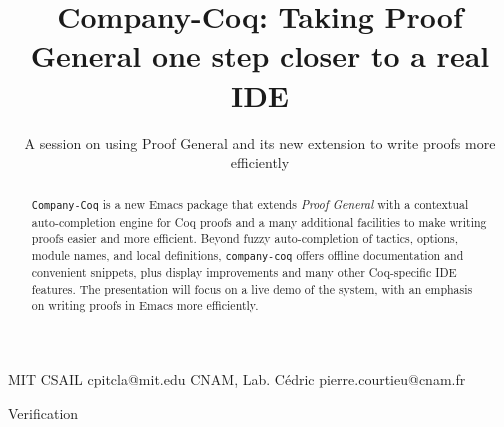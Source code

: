 \documentclass[preprint]{sigplanconf}
\begin{document}
\setlength{\pdfpageheight}{\paperheight}
\setlength{\pdfpagewidth}{\paperwidth}





\titlebanner{}        %

\title{Company-Coq: Taking Proof General one step closer to a real IDE}
\subtitle{A session on using Proof General and its new extension to write proofs more efficiently}

           {MIT CSAIL}
           {cpitcla@mit.edu}
           {CNAM, Lab. Cédric}
           {pierre.courtieu@cnam.fr}

\maketitle

\begin{abstract}
\texttt{Company-Coq} is a new Emacs package that extends \emph{Proof General} with a contextual auto-completion engine for Coq proofs and a many additional facilities to make writing proofs easier and more efficient. Beyond fuzzy auto-completion of tactics, options, module names, and local definitions, \texttt{company-coq} offers offline documentation and convenient snippets, plus display improvements and many other Coq-specific IDE features. The presentation will focus on a live demo of the system, with an emphasis on writing proofs in Emacs more efficiently.
\end{abstract}


\terms Verification
\end{document}

